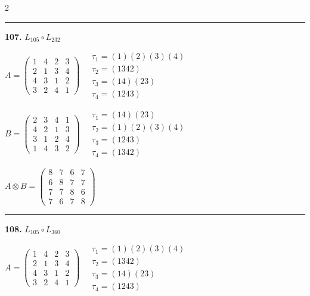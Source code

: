 \begin{multicols}{2}
\vspace{0.3em}
\hrule
\vspace{0.3em}

\noindent\textbf{107.} $L_{105} \circ L_{232}$

$A = \begin{pmatrix} 1 & 4 & 2 & 3 \\ 2 & 1 & 3 & 4 \\ 4 & 3 & 1 & 2 \\ 3 & 2 & 4 & 1 \end{pmatrix} \quad \begin{matrix} \tau_{1}=(1)(2)(3)(4) \\ \tau_{2}=(1 3 4 2) \\ \tau_{3}=(1 4)(2 3) \\ \tau_{4}=(1 2 4 3) \end{matrix}$

$B = \begin{pmatrix} 2 & 3 & 4 & 1 \\ 4 & 2 & 1 & 3 \\ 3 & 1 & 2 & 4 \\ 1 & 4 & 3 & 2 \end{pmatrix} \quad \begin{matrix} \tau_{1}=(1 4)(2 3) \\ \tau_{2}=(1)(2)(3)(4) \\ \tau_{3}=(1 2 4 3) \\ \tau_{4}=(1 3 4 2) \end{matrix}$

$A \otimes B = \begin{pmatrix} 8 & 7 & 6 & 7 \\ 6 & 8 & 7 & 7 \\ 7 & 7 & 8 & 6 \\ 7 & 6 & 7 & 8 \end{pmatrix}$

\vspace{0.3em}
\hrule
\vspace{0.3em}

\noindent\textbf{108.} $L_{105} \circ L_{360}$

$A = \begin{pmatrix} 1 & 4 & 2 & 3 \\ 2 & 1 & 3 & 4 \\ 4 & 3 & 1 & 2 \\ 3 & 2 & 4 & 1 \end{pmatrix} \quad \begin{matrix} \tau_{1}=(1)(2)(3)(4) \\ \tau_{2}=(1 3 4 2) \\ \tau_{3}=(1 4)(2 3) \\ \tau_{4}=(1 2 4 3) \end{matrix}$


\end{multicols}
